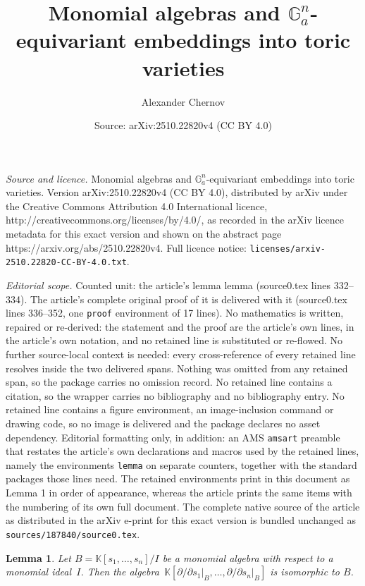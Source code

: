 \documentclass[10pt,a4paper]{amsart}
\title{Monomial algebras and $\mathbb{G}_a^n$-equivariant embeddings into toric varieties}
\author{Alexander Chernov}
\date{Source: arXiv:2510.22820v4 (CC BY 4.0)}
\newtheorem{lemma}{Lemma}
\def\BK{{\mathbb K}}
\begin{document}
\maketitle

\noindent\emph{Source and licence.} Monomial algebras and $\mathbb{G}_a^n$-equivariant embeddings into toric varieties. Version arXiv:2510.22820v4 (CC BY 4.0), distributed by arXiv under the Creative Commons Attribution 4.0 International licence, http://creativecommons.org/licenses/by/4.0/, as recorded in the arXiv licence metadata for this exact version and shown on the abstract page https://arxiv.org/abs/2510.22820v4. Full licence notice: \texttt{licenses/arxiv-2510.22820-CC-BY-4.0.txt}.\par\smallskip

\noindent\textit{Editorial scope.} Counted unit: the article's lemma lemma (source0.tex lines 332--334). The article's complete original proof of it is delivered with it (source0.tex lines 336--352, one \texttt{proof} environment of 17 lines). No mathematics is written, repaired or re-derived: the statement and the proof are the article's own lines, in the article's own notation, and no retained line is substituted or re-flowed.  No further source-local context is needed: every cross-reference of every retained line resolves inside the two delivered spans.  Nothing was omitted from any retained span, so the package carries no omission record.  No retained line contains a citation, so the wrapper carries no bibliography and no bibliography entry.  No retained line contains a figure environment, an image-inclusion command or drawing code, so no image is delivered and the package declares no asset dependency.  Editorial formatting only, in addition: an AMS \texttt{amsart} preamble that restates the article's own declarations and macros used by the retained lines, namely the environments \texttt{lemma} on separate counters, together with the standard packages those lines need.  The retained environments print in this document as Lemma 1 in order of appearance, whereas the article prints the same items with the numbering of its own full document.  The complete native source of the article as distributed in the arXiv e-print for this exact version is bundled unchanged as \texttt{sources/187840/source0.tex}.
    \begin{lemma}
        Let $B = \BK[s_1,\dotsc,s_n]/I$ be a monomial algebra with respect to a monomial ideal~$I$. Then the algebra~$\BK[\partial/\partial s_1\big|_B,\dotsc,\partial/\partial s_n\big|_B]$ is isomorphic to $B$.
    \end{lemma}
\end{document}

